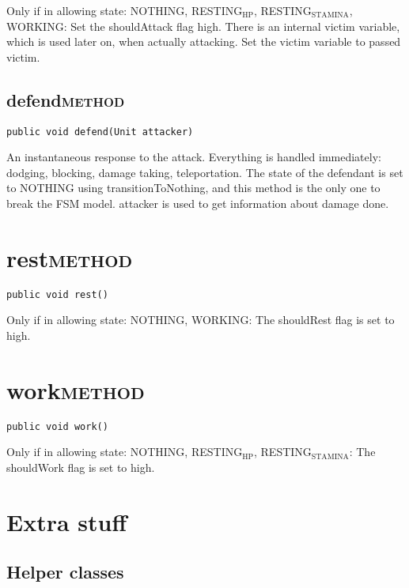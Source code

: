 \documentclass[11pt]{article}
\begin{document}
Only if in allowing state: NOTHING, RESTING$_{\text{HP}}$, RESTING$_{\text{STAMINA}}$, WORKING:
Set the shouldAttack flag high. There is an internal victim variable, which is
used later on, when actually attacking. Set the victim variable to passed
victim.


\subsection{defend\hfill{}\textsc{method}}
\label{sec-4-2}

\begin{verbatim}
public void defend(Unit attacker)
\end{verbatim}

An instantaneous response to the attack. Everything is handled immediately:
dodging, blocking, damage taking, teleportation. The state of the defendant is
set to NOTHING using transitionToNothing, and this method is the only one to
break the FSM model. attacker is used to get information about damage done.


\section{rest\hfill{}\textsc{method}}
\label{sec-5}

\begin{verbatim}
public void rest()
\end{verbatim}

Only if in allowing state: NOTHING, WORKING:
The shouldRest flag is set to high.


\section{work\hfill{}\textsc{method}}
\label{sec-6}

\begin{verbatim}
public void work()
\end{verbatim}

Only if in allowing state: NOTHING, RESTING$_{\text{HP}}$, RESTING$_{\text{STAMINA}}$:
The shouldWork flag is set to high.


\section{Extra stuff}
\label{sec-7}

\subsection{Helper classes}
\label{sec-7-1}
\end{document}
